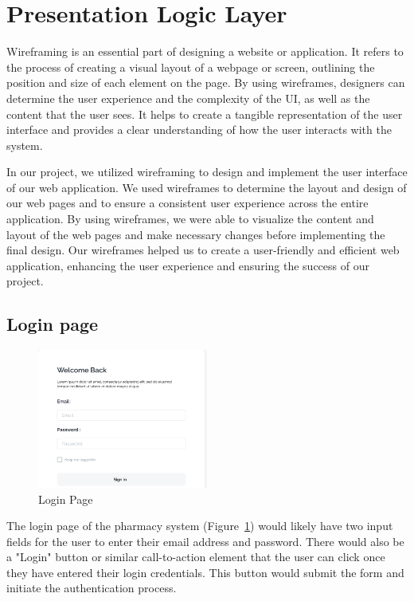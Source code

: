\section{Presentation Logic Layer}


\par Wireframing is an essential part of designing a website or application. It refers to the process of creating a visual layout of a webpage or screen, outlining the position and size of each element on the page. By using wireframes, designers can determine the user experience and the complexity of the UI, as well as the content that the user sees. It helps to create a tangible representation of the user interface and provides a clear understanding of how the user interacts with the system.

In our project, we utilized wireframing to design and implement the user interface of our web application. We used wireframes to determine the layout and design of our web pages and to ensure a consistent user experience across the entire application. By using wireframes, we were able to visualize the content and layout of the web pages and make necessary changes before implementing the final design. Our wireframes helped us to create a user-friendly and efficient web application, enhancing the user experience and ensuring the success of our project.

\subsection{Login page}
\begin{figure}[h]
\centering
\includegraphics[width=0.5\textwidth]{sections/login_WF.png}
\caption{Login Page}
\label{fig:login}
\end{figure}

The login page of the pharmacy system (Figure~\ref{fig:login}) would likely have two input fields for the user to enter their email address and password. There would also be a "Login" button or similar call-to-action element that the user can click once they have entered their login credentials. This button would submit the form and initiate the authentication process.
\newpage
